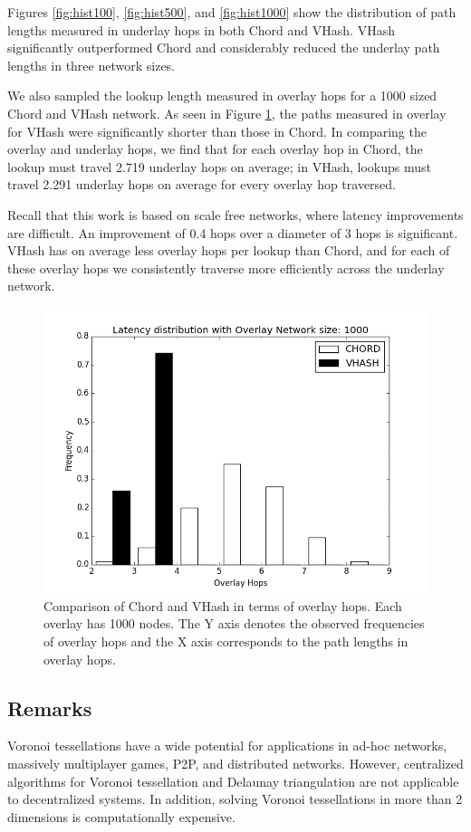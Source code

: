 Figures \ref{fig:hist100}, \ref{fig:hist500}, and \ref{fig:hist1000} show the distribution of path lengths measured in underlay hops in both Chord and VHash.
VHash significantly outperformed Chord and considerably reduced the underlay path lengths in three network sizes.

We also sampled the lookup length measured in overlay hops for a 1000 sized Chord and VHash network.
As seen in Figure \ref{fig:histover}, the paths measured in overlay for VHash were significantly shorter than those in Chord.
In comparing the overlay and underlay hops, we find that for each overlay hop in Chord, the lookup must travel 2.719 underlay hops on average; in VHash, lookups must travel 2.291 underlay hops on average for every overlay hop traversed.

Recall that this work is based on scale free networks, where latency improvements are difficult.
An improvement of 0.4 hops over a diameter of 3 hops is significant.
VHash has on average less overlay hops per lookup than Chord, and for each of these overlay hops we consistently traverse more efficiently across the underlay network.
\begin{figure}
	\centering
	\includegraphics[width=0.5\linewidth]{figs/hist_overlay_4d}
	\caption{Comparison of Chord and VHash in terms of overlay hops.  Each overlay has 1000 nodes.  The Y axis denotes the observed frequencies of overlay hops and the X axis corresponds to the path lengths in overlay hops.}
	\label{fig:histover}
\end{figure}




\subsection{Remarks}

Voronoi tessellations have a wide potential for applications in ad-hoc networks, massively multiplayer games, P2P, and distributed networks.
However, centralized algorithms for Voronoi tessellation and Delaunay triangulation are not applicable to decentralized systems.
In addition, solving Voronoi tessellations in more than 2 dimensions is computationally expensive.

